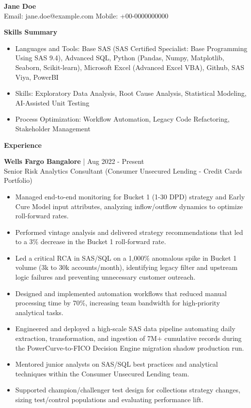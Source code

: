 \documentclass[9.5pt]{article}
\newcommand{\sectionhead}[1]{\vspace{4pt}\textbf{#1}\vspace{1pt}\par}
\begin{document}
\begin{center}
{\LARGE \textbf{Jane Doe}}\\[2pt]
Email: jane.doe@example.com \quad Mobile: +00-0000000000
\end{center}

\sectionhead{Skills Summary}
\begin{itemize}
\item Languages and Tools: Base SAS (SAS Certified Specialist: Base Programming Using SAS 9.4), Advanced SQL, Python (Pandas, Numpy, Matplotlib, Seaborn, Scikit-learn), Microsoft Excel (Advanced Excel VBA), Github, SAS Viya, PowerBI
\item Skills: Exploratory Data Analysis, Root Cause Analysis, Statistical Modeling, AI-Assisted Unit Testing
\item Process Optimization: Workflow Automation, Legacy Code Refactoring, Stakeholder Management
\end{itemize}

\sectionhead{Experience}
\textbf{Wells Fargo Bangalore} \quad | \quad Aug 2022 - Present\\
Senior Risk Analytics Consultant (Consumer Unsecured Lending - Credit Cards Portfolio)
\begin{itemize}
\item Managed end-to-end monitoring for Bucket 1 (1-30 DPD) strategy and Early Cure Model input attributes, analyzing inflow/outflow dynamics to optimize roll-forward rates.
\item Performed vintage analysis and delivered strategy recommendations that led to a 3\% decrease in the Bucket 1 roll-forward rate.
\item Led a critical RCA in SAS/SQL on a 1,000\% anomalous spike in Bucket 1 volume (3k to 30k accounts/month), identifying legacy filter and upstream logic failures and preventing unnecessary customer outreach.
\item Designed and implemented automation workflows that reduced manual processing time by 70\%, increasing team bandwidth for high-priority analytical tasks.
\item Engineered and deployed a high-scale SAS data pipeline automating daily extraction, transformation, and ingestion of 7M+ cumulative records during the PowerCurve-to-FICO Decision Engine migration shadow production run.
\item Mentored junior analysts on SAS/SQL best practices and analytical techniques within the Consumer Unsecured Lending team.
\item Supported champion/challenger test design for collections strategy changes, sizing test/control populations and evaluating performance lift.
\end{itemize}
\end{document}

